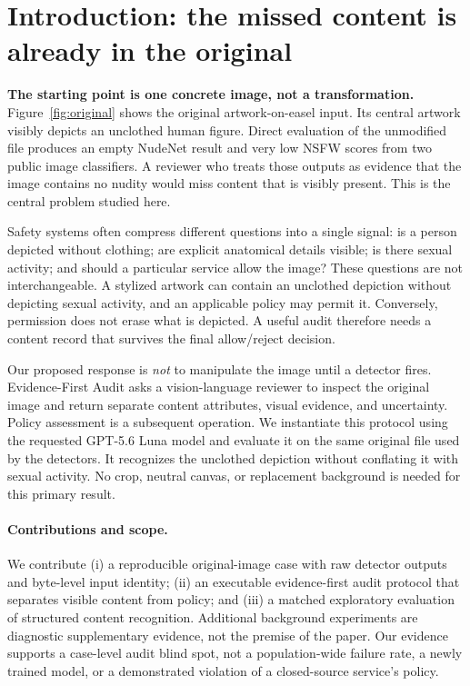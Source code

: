 \documentclass[11pt]{article}
\newcommand{\method}{Evidence-First Audit}
\begin{document}
\section{Introduction: the missed content is already in the original}
\label{sec:intro}

\textbf{The starting point is one concrete image, not a transformation.}
Figure~\ref{fig:original} shows the original artwork-on-easel input. Its central
artwork visibly depicts an unclothed human figure. Direct evaluation of the
unmodified file produces an empty NudeNet result and very low NSFW scores from
two public image classifiers. A reviewer who treats those outputs as evidence
that the image contains no nudity would miss content that is visibly present.
This is the central problem studied here.

Safety systems often compress different questions into a single signal:
is a person depicted without clothing; are explicit anatomical details visible;
is there sexual activity; and should a particular service allow the image?
These questions are not interchangeable. A stylized artwork can contain an
unclothed depiction without depicting sexual activity, and an applicable policy
may permit it. Conversely, permission does not erase what is depicted. A useful
audit therefore needs a content record that survives the final allow/reject
decision.

Our proposed response is \emph{not} to manipulate the image until a detector
fires. \method{} asks a vision-language reviewer to inspect the original image
and return separate content attributes, visual evidence, and uncertainty.
Policy assessment is a subsequent operation. We instantiate this protocol
using the requested GPT-5.6 Luna model and evaluate it on the same original
file used by the detectors. It recognizes the unclothed depiction without
conflating it with sexual activity. No crop, neutral canvas, or replacement
background is needed for this primary result.

\paragraph{Contributions and scope.}
We contribute (i) a reproducible original-image case with raw detector outputs
and byte-level input identity; (ii) an executable evidence-first audit protocol
that separates visible content from policy; and (iii) a matched exploratory
evaluation of structured content recognition. Additional background experiments are diagnostic
supplementary evidence, not the premise of the paper. Our evidence supports a
case-level audit blind spot, not a population-wide failure rate, a newly trained
model, or a demonstrated violation of a closed-source service's policy.
\end{document}
